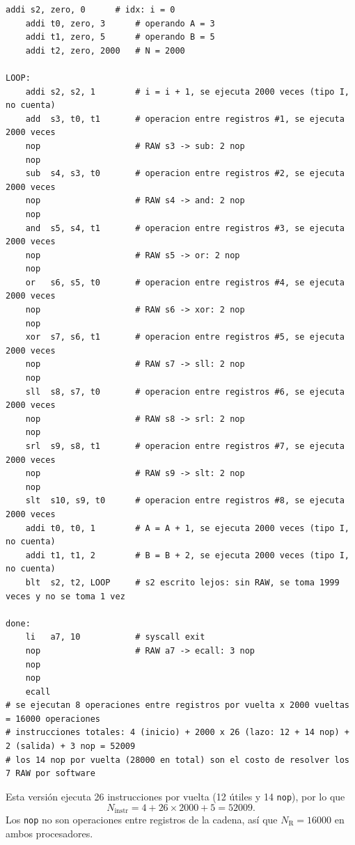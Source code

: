 \documentclass[11pt,a4paper]{article}
\begin{document}
\begin{lstlisting}[style=asm,caption={Versi\'on con \texttt{nop} para el procesador sin forwarding ni detecci\'on de hazards.},label={lst:regs_nops}]
    addi s2, zero, 0      # idx: i = 0
    addi t0, zero, 3      # operando A = 3
    addi t1, zero, 5      # operando B = 5
    addi t2, zero, 2000   # N = 2000

LOOP:
    addi s2, s2, 1        # i = i + 1, se ejecuta 2000 veces (tipo I, no cuenta)
    add  s3, t0, t1       # operacion entre registros #1, se ejecuta 2000 veces
    nop                   # RAW s3 -> sub: 2 nop
    nop
    sub  s4, s3, t0       # operacion entre registros #2, se ejecuta 2000 veces
    nop                   # RAW s4 -> and: 2 nop
    nop
    and  s5, s4, t1       # operacion entre registros #3, se ejecuta 2000 veces
    nop                   # RAW s5 -> or: 2 nop
    nop
    or   s6, s5, t0       # operacion entre registros #4, se ejecuta 2000 veces
    nop                   # RAW s6 -> xor: 2 nop
    nop
    xor  s7, s6, t1       # operacion entre registros #5, se ejecuta 2000 veces
    nop                   # RAW s7 -> sll: 2 nop
    nop
    sll  s8, s7, t0       # operacion entre registros #6, se ejecuta 2000 veces
    nop                   # RAW s8 -> srl: 2 nop
    nop
    srl  s9, s8, t1       # operacion entre registros #7, se ejecuta 2000 veces
    nop                   # RAW s9 -> slt: 2 nop
    nop
    slt  s10, s9, t0      # operacion entre registros #8, se ejecuta 2000 veces
    addi t0, t0, 1        # A = A + 1, se ejecuta 2000 veces (tipo I, no cuenta)
    addi t1, t1, 2        # B = B + 2, se ejecuta 2000 veces (tipo I, no cuenta)
    blt  s2, t2, LOOP     # s2 escrito lejos: sin RAW, se toma 1999 veces y no se toma 1 vez

done:
    li   a7, 10           # syscall exit
    nop                   # RAW a7 -> ecall: 3 nop
    nop
    nop
    ecall
# se ejecutan 8 operaciones entre registros por vuelta x 2000 vueltas = 16000 operaciones
# instrucciones totales: 4 (inicio) + 2000 x 26 (lazo: 12 + 14 nop) + 2 (salida) + 3 nop = 52009
# los 14 nop por vuelta (28000 en total) son el costo de resolver los 7 RAW por software
\end{lstlisting}

Esta versi\'on ejecuta 26 instrucciones por vuelta (12 \'utiles y 14 \texttt{nop}),
por lo que
\begin{equation}
  N_{\text{instr}} = 4 + 26 \times 2000 + 5 = 52009 .
\end{equation}
Los \texttt{nop} no son operaciones entre registros de la cadena, as\'i que
$N_{\text{R}} = 16000$ en ambos procesadores.
\end{document}
